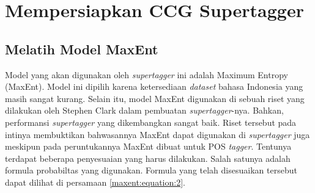 
\section{Mempersiapkan CCG Supertagger}

\subsection{Melatih Model MaxEnt}

Model yang akan digunakan oleh \textit{supertagger} ini adalah Maximum Entropy (MaxEnt).
Model ini dipilih karena ketersediaan \textit{dataset} bahasa Indonesia yang masih sangat kurang.
Selain itu, model MaxEnt digunakan di sebuah riset yang dilakukan oleh Stephen Clark dalam
pembuatan \textit{supertagger}-nya.
Bahkan, performansi \textit{supertagger} yang dikembangkan sangat baik.
Riset tersebut pada intinya membuktikan bahwasannya MaxEnt dapat digunakan di \textit{supertagger}
juga meskipun pada peruntukannya MaxEnt dibuat untuk POS \textit{tagger}.
Tentunya terdapat beberapa penyesuaian yang harus dilakukan.
Salah satunya adalah formula probabiltas yang digunakan.
Formula yang telah disesuaikan tersebut dapat dilihat di persamaan \ref{maxent:equation:2}.

